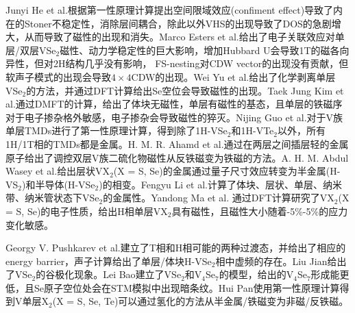\documentclass[reprint, aps, prb, showkeys]{revtex4-2}
\begin{document}
Junyi He et al.\cite{he2020confinement}根据第一性原理计算提出空间限域效应(confiment effect)导致了内在的Stoner不稳定性，消除层间耦合，除此以外VHS的出现导致了DOS的急剧增大，从而导致了磁性的出现和消失。Marco Esters et al.\cite{PhysRevB.96.235147}给出了电子关联效应对单层/双层VSe$_2$磁性、动力学稳定性的巨大影响，增加Hubbard U会导致1T的磁各向异性，但对2H结构几乎没有影响， FS-nesting对CDW vector的出现没有贡献，但软声子模式的出现会导致$4 \times 4$CDW的出现。Wei Yu et al.\cite{https://doi.org/10.1002/adma.201903779}给出了化学剥离单层VSe$_2$的方法，并通过DFT计算给出Se空位会导致磁性的出现。Taek Jung Kim et al.\cite{Kim_2020}通过DMFT的计算，给出了体块无磁性，单层有磁性的基态，且单层的铁磁序对于电子掺杂格外敏感，电子掺杂会导致磁性的猝灭。Nijing Guo et al.\cite{GUO2020109540}对于V族单层TMDs进行了第一性原理计算，得到除了1H-VSe$_2$和1H-VTe$_2$以外，所有1H/1T相的TMDs都是金属。H. M. R. Ahamd et al.\cite{doi:10.1063/1.5139061}通过在两层之间插层轻的金属原子给出了调控双层V族二硫化物磁性从反铁磁变为铁磁的方法。A. H. M. Abdul Wasey et al.\cite{doi:10.1063/1.4908114}给出层状VX$_2$(X = S, Se)的金属通过量子尺寸效应转变为半金属(H-VS$_2$)和半导体(H-VSe$_2$)的相变。Fengyu Li et al.\cite{doi:10.1021/jp507093t}计算了体块、层状、单层、纳米带、纳米管状态下VSe$_2$的金属性。Yandong Ma et al. \cite{doi:10.1021/nn204667z}通过DFT计算研究了VX$_2$(X = S, Se)的电子性质，给出H相单层VX$_2$具有磁性，且磁性大小随着-5\%-5\%的应力变化敏感。

Georgy V. Pushkarev et al.\cite{C9CP03726H}建立了T相和H相可能的两种过渡态，并给出了相应的energy barrier，声子计算给出了单层/体块H-VSe$_2$相中虚频的存在。Liu Jian\cite{cnki1}给出了VSe$_2$的谷极化现象。Lei Bao\cite{cnki2}建立了VSe$_2$和V$_4$Se$_7$的模型，给出的V$_4$Se$_7$形成能更低，且Se原子空位处会在STM模拟中出现暗条纹。Hui Pan\cite{doi:10.1021/jp503030b}使用第一性原理计算得到V单层X$_2$(X = S, Se, Te)可以通过氢化的方法从半金属/铁磁变为非磁/反铁磁。

\end{document}
